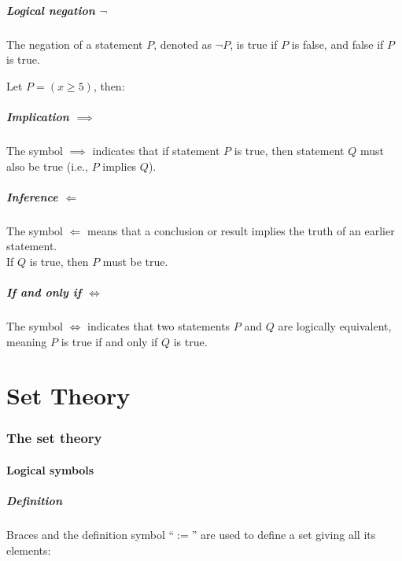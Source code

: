 \documentclass{article}
\begin{document}
\subsubsection{Logical negation $\lnot$}
The negation of a statement $P$, denoted as $\lnot P$, is true if $P$ is false, and false if $P$ is true.

Let $P=(x \geq 5)$, then:

\subsubsection{Implication $\implies$}
The symbol $\implies$ indicates that if statement $P$ is true, then statement $Q$ must also be true (i.e., $P$ implies $Q$).\\


\subsubsection{Inference $\Longleftarrow$}
The symbol $\Leftarrow$ means that a conclusion or result implies the truth of an earlier statement.\\
If $Q$ is true, then $P$ must be true.


\subsubsection{If and only if $\Leftrightarrow$}
The symbol $\Leftrightarrow$ indicates that two statements $P$ and $Q$ are logically equivalent, meaning $P$ is true if and only if $Q$ is true.

\part{Set Theory}
\section{The set theory}
\subsection{Logical symbols}
\subsubsection{Definition}
Braces and the definition symbol ``$:=$'' are used to define a set giving all its elements:
\end{document}
